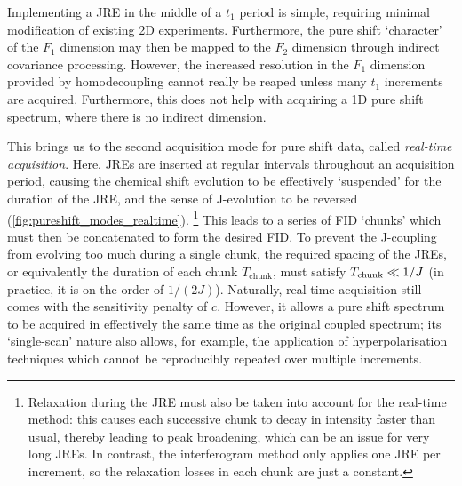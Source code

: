Implementing a JRE in the middle of a $t_1$ period is simple, requiring minimal modification of existing 2D experiments.
Furthermore, the pure shift `character' of the $F_1$ dimension may then be mapped to the $F_2$ dimension through indirect covariance processing\autocite{Bruschweiler2004JCP,Zhang2004JACS,Jaeger2014ARNMRS,Morris2010JACS,Aguilar2012ACIE,Foroozandeh2014JACS}.
However, the increased resolution in the $F_1$ dimension provided by homodecoupling cannot really be reaped unless many $t_1$ increments are acquired.
Furthermore, this does not help with acquiring a 1D pure shift spectrum, where there is no indirect dimension.

This brings us to the second acquisition mode for pure shift data, called \textit{real-time acquisition}\autocite{Lupulescu2012JMR,Meyer2013ACIE,Mauhart2015JMR,Kiraly2018MRC}.
Here, JREs are inserted at regular intervals throughout an acquisition period, causing the chemical shift evolution to be effectively `suspended' for the duration of the JRE, and the sense of J-evolution to be reversed (\cref{fig:pureshift_modes_realtime}).%
\footnote{Relaxation during the JRE must also be taken into account for the real-time method: this causes each successive chunk to decay in intensity faster than usual, thereby leading to peak broadening, which can be an issue for very long JREs.
In contrast, the interferogram method only applies one JRE per increment, so the relaxation losses in each chunk are just a constant.}
This leads to a series of FID `chunks' which must then be concatenated to form the desired FID.
To prevent the J-coupling from evolving too much during a single chunk, the required spacing of the JREs, or equivalently the duration of each chunk $T_\text{chunk}$, must satisfy $T_\text{chunk} \ll 1/J\/$ (in practice, it is on the order of $1/(2J)$).
Naturally, real-time acquisition still comes with the sensitivity penalty of $c$.
However, it allows a pure shift spectrum to be acquired in effectively the same time as the original coupled spectrum; its `single-scan' nature also allows, for example, the application of hyperpolarisation techniques which cannot be reproducibly repeated over multiple increments.\autocite{Donovan2014ACIE,Taylor2021MRC}

